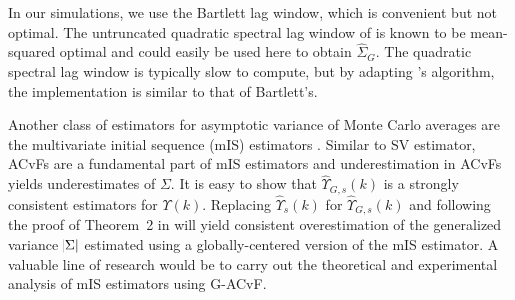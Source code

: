 \documentclass[11pt]{article}
\theoremstyle{remark}
\begin{document}
In our simulations, we use the Bartlett lag window, which is convenient but not optimal. The untruncated quadratic spectral lag window of \cite{andr:1991} is known to be mean-squared optimal and could easily be used here to obtain $\hat{\Sigma}_G$. The quadratic spectral lag window is typically slow to compute, but by adapting  \citeauthor{heberle2017fast}'s algorithm, the implementation is similar to that of Bartlett's. 

%

Another class of estimators for asymptotic variance of Monte Carlo averages are the multivariate initial sequence (mIS) estimators \citep{dai:jon:2017}. Similar to SV estimator, ACvFs are a  fundamental part of mIS estimators and underestimation in ACvFs yields underestimates of $\Sigma$. 
It is easy to show that $\hat{\Upsilon}_{G,s}(k)$ is a strongly consistent estimators for $\Upsilon(k)$. Replacing $\hat{\Upsilon}_s(k)$ for $\hat{\Upsilon}_{G,s}(k)$ and following the proof of Theorem~2 in \citep{dai:jon:2017} will yield consistent overestimation of the generalized variance $\abs{\Sigma}$ estimated using a globally-centered version of the mIS estimator.  A valuable line of research would be to carry out the theoretical and experimental analysis of mIS estimators using G-ACvF. 

%
\end{document}
